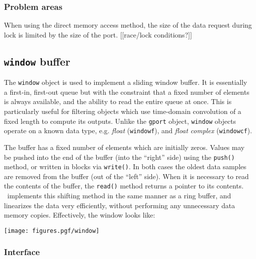 \subsubsection{Problem areas}
When using the direct memory access method, the size of the data request
during lock is limited by the size of the port.
[[race/lock conditions?]]

\subsection{{\tt window} buffer}
\label{module:buffer:window}
The {\tt window} object is used to implement a sliding window buffer.
It is essentially a first-in, first-out queue but with the constraint that a
fixed number of elements is always available, and the ability to read the
entire queue at once.
This is particularly useful for filtering objects which use time-domain
convolution of a fixed length to compute its outputs.
Unlike the {\tt gport} object, {\tt window} objects operate on a known data
type, e.g.
{\it float} ({\tt windowf}), and
{\it float complex} ({\tt windowcf}).

The buffer has a fixed number of elements which are initially zeros.
Values may be pushed into the end of the buffer (into the ``right'' side)
using the {\tt push()} method, or written in blocks via {\tt write()}.
In both cases the oldest data samples are removed from the buffer (out of the
``left'' side).
When it is necessary to read the contents of the buffer, the {\tt read()}
method returns a pointer to its contents.
\liquid\ implements this shifting method in the same manner as a ring buffer,
and linearizes the data very efficiently, without performing any unnecessary
data memory copies.
Effectively, the window looks like:

\begin{centering}
\texttt{[image: figures.pgf/window]}
\end{centering}

\subsubsection{Interface}
\label{module:buffer:window:interface}

